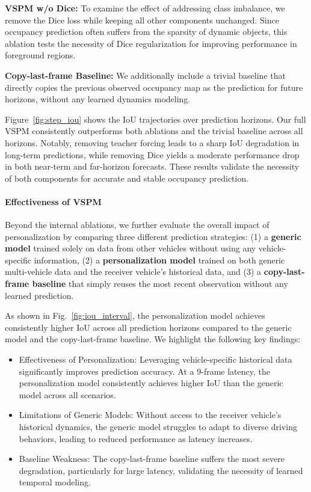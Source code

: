 \textbf{VSPM w/o Dice:}  
To examine the effect of addressing class imbalance, we remove the Dice loss while keeping all other components unchanged. Since occupancy prediction often suffers from the sparsity of dynamic objects, this ablation tests the necessity of Dice regularization for improving performance in foreground regions.

\textbf{Copy-last-frame Baseline:}  
We additionally include a trivial baseline that directly copies the previous observed occupancy map as the prediction for future horizons, without any learned dynamics modeling.

Figure~\ref{fig:step_iou} shows the IoU trajectories over prediction horizons. Our full VSPM consistently outperforms both ablations and the trivial baseline across all horizons. Notably, removing teacher forcing leads to a sharp IoU degradation in long-term predictions, while removing Dice yields a moderate performance drop in both near-term and far-horizon forecasts. These results validate the necessity of both components for accurate and stable occupancy prediction.



\paragraph{Effectiveness of VSPM}

Beyond the internal ablations, we further evaluate the overall impact of personalization by comparing three different prediction strategies:  
(1) a \textbf{generic model} trained solely on data from other vehicles without using any vehicle-specific information,  
(2) a \textbf{personalization model} trained on both generic multi-vehicle data and the receiver vehicle's historical data, and  
(3) a \textbf{copy-last-frame baseline} that simply reuses the most recent observation without any learned prediction.


 
As shown in Fig.~\ref{fig:iou_interval}, the personalization model achieves consistently higher IoU across all prediction horizons compared to the generic model and the copy-last-frame baseline. We highlight the following key findings:
\begin{itemize}[leftmargin=*,itemsep=0pt,parsep=0.2em,topsep=0.2em,partopsep=0.0em]
    \item Effectiveness of Personalization: Leveraging vehicle-specific historical data significantly improves prediction accuracy. At a $9$-frame latency, the personalization model consistently achieves higher IoU than the generic model across all scenarios.
    \item Limitations of Generic Models: Without access to the receiver vehicle's historical dynamics, the generic model struggles to adapt to diverse driving behaviors, leading to reduced performance as latency increases.
    \item Baseline Weakness: The copy-last-frame baseline suffers the most severe degradation, particularly for large latency, validating the necessity of learned temporal modeling.
\end{itemize}

